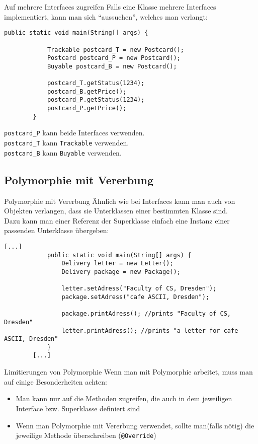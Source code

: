 \begin{frame}[fragile]{Auf mehrere Interfaces zugreifen}
    Falls eine Klasse mehrere Interfaces implementiert, kann man sich \enquote{aussuchen}, welches man verlangt:
    \begin{lstlisting}[gobble=8]
        public static void main(String[] args) {
        
            Trackable postcard_T = new Postcard();
            Postcard postcard_P = new Postcard();
            Buyable postcard_B = new Postcard();

            postcard_T.getStatus(1234);
            postcard_B.getPrice();
            postcard_P.getStatus(1234);
            postcard_P.getPrice();
        }
	\end{lstlisting}
	\texttt{postcard\_P} kann beide Interfaces verwenden.\\
    \texttt{postcard\_T} kann \texttt{Trackable} verwenden.\\
    \texttt{postcard\_B} kann \texttt{Buyable} verwenden.
\end{frame}

\subsection{Polymorphie mit Vererbung}
\begin{frame}[fragile]{Polymorphie mit Vererbung}
    Ähnlich wie bei Interfaces kann man auch von Objekten verlangen, dass sie Unterklassen einer bestimmten Klasse sind. \\
    Dazu kann man einer Referenz der Superklasse einfach eine Instanz einer passenden Unterklasse übergeben:
    \begin{lstlisting}[gobble=8]
        [...]
            public static void main(String[] args) {
                Delivery letter = new Letter();
                Delivery package = new Package();
               
                letter.setAdress("Faculty of CS, Dresden");
                package.setAdress("cafe ASCII, Dresden");

                package.printAdress(); //prints "Faculty of CS, Dresden"
                letter.printAdress(); //prints "a letter for cafe ASCII, Dresden"
            }
        [...]
    \end{lstlisting}
\end{frame}

\begin{frame}[fragile]{Limitierungen von Polymorphie}
    Wenn man mit Polymorphie arbeitet, muss man auf einige Besonderheiten achten:
    \begin{itemize}[<+->]
        \item Man kann nur auf die Methoden zugreifen, die auch in dem jeweiligen Interface bzw. Superklasse definiert sind
        \item Wenn man Polymorphie mit Vererbung verwendet, sollte man(falls nötig) die jeweilige Methode überschreiben (\texttt{@Override})
    \end{itemize}
\end{frame}


